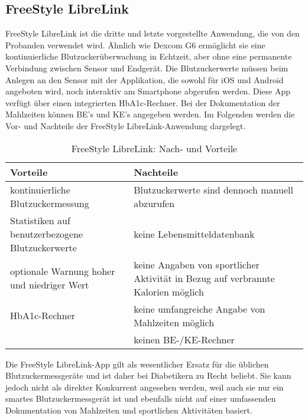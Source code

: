 	\subsection{FreeStyle LibreLink}
	FreeStyle LibreLink ist die dritte und letzte vorgestellte Anwendung, die von den Probanden verwendet wird. Ähnlich wie Dexcom G6 ermöglicht sie eine kontinuierliche Blutzuckerüberwachung in Echtzeit, aber ohne eine permanente Verbindung zwischen Sensor und Endgerät. Die Blutzuckerwerte müssen beim Anlegen an den Sensor mit der Applikation, die sowohl für iOS und Android angeboten wird, noch interaktiv am Smartphone abgerufen werden. Diese App verfügt über einen integrierten HbA1c-Rechner. Bei der Dokumentation der Mahlzeiten können BE’s und KE’s angegeben werden. \newline
	Im Folgenden werden die Vor- und Nachteile der FreeStyle LibreLink-Anwendung dargelegt. \cite{AD}
	\begin{table}[H]
		\setlength{\tabcolsep}{12pt}
		\centering
		\begin{tabular}{p{6cm}|p{6cm}}
			\toprule
			\textbf{Vorteile} & \textbf{Nachteile}\\
			\hline
			kontinuierliche Blutzuckermessung & Blutzuckerwerte sind dennoch manuell abzurufen\\
			\hline
			Statistiken auf benutzerbezogene Blutzuckerwerte & keine Lebensmitteldatenbank\\
			\hline
			optionale Warnung hoher und niedriger Wert & keine Angaben von sportlicher Aktivität in Bezug auf verbrannte Kalorien möglich\\
			\hline
			HbA1c-Rechner & keine umfangreiche Angabe von Mahlzeiten möglich\\
			\hline
			 & keinen BE-/KE-Rechner\\
			\bottomrule
		\end{tabular}
		\captionsetup{justification=centering}
		\caption{FreeStyle LibreLink: Nach- und Vorteile}
		\label{tab:Libre}
	\end{table}
	\setlength{\parindent}{0pt}Die FreeStyle LibreLink-App gilt als wesentlicher Ersatz für die üblichen Blutzuckermessgeräte und ist daher bei Diabetikern zu Recht beliebt. Sie kann jedoch nicht als direkter Konkurrent angesehen werden, weil auch sie \glqq nur\grqq{} ein smartes Blutzuckermessgerät ist und ebenfalls nicht auf einer umfassenden Dokumentation von Mahlzeiten und sportlichen Aktivitäten basiert.
